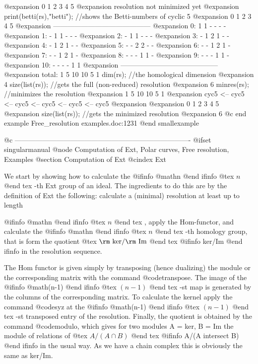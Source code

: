@expansion{} 0         1         2          3          4         5         
@expansion{} resolution not minimized yet
@expansion{} 
  print(betti(rs),"betti");  //shows the Betti-numbers of cyclic 5
@expansion{}            0     1     2     3     4     5
@expansion{} ------------------------------------------
@expansion{}     0:     1     1     -     -     -     -
@expansion{}     1:     -     1     1     -     -     -
@expansion{}     2:     -     1     1     -     -     -
@expansion{}     3:     -     1     2     1     -     -
@expansion{}     4:     -     1     2     1     -     -
@expansion{}     5:     -     -     2     2     -     -
@expansion{}     6:     -     -     1     2     1     -
@expansion{}     7:     -     -     1     2     1     -
@expansion{}     8:     -     -     -     1     1     -
@expansion{}     9:     -     -     -     1     1     -
@expansion{}    10:     -     -     -     -     1     1
@expansion{} ------------------------------------------
@expansion{} total:     1     5    10    10     5     1
  dim(rs);                   //the homological dimension
@expansion{} 4
  size(list(rs));            //gets the full (non-reduced) resolution
@expansion{} 6
  minres(rs);                //minimizes the resolution
@expansion{}     1         5         10         10         5         1         
@expansion{} cyc5 <--  cyc5 <--  cyc5 <--   cyc5 <--   cyc5 <--  cyc5
@expansion{} 
@expansion{} 0         1         2          3          4         5         
@expansion{} 
  size(list(rs));            //gets the minimized resolution
@expansion{} 6
@c end example Free_resolution examples.doc:1231
@end smallexample


@c ----------------------------------------------------------------------------
@ifset singularmanual
@node Computation of Ext, Polar curves, Free resolution, Examples
@section  Computation of Ext
@cindex  Ext

We start by showing how to calculate the 
@ifinfo
@math{n}
@end ifinfo
@tex
$n$
@end tex
-th Ext group of an
ideal. The ingredients to do this are by the definition of Ext the
following: calculate a (minimal) resolution at least up to length

@ifinfo
@math{n}
@end ifinfo
@tex
$n$
@end tex
, apply the Hom-functor, and calculate the 
@ifinfo
@math{n}
@end ifinfo
@tex
$n$
@end tex
-th homology
group, that is form the quotient
@tex
$\hbox{\rm ker} / \hbox{\rm Im}$
@end tex
@ifinfo
ker/Im
@end ifinfo
in the resolution sequence.

The Hom functor is given simply by transposing (hence dualizing) the
module or the corresponding matrix with the command @code{transpose}.
The image of the 
@ifinfo
@math{(n-1)}
@end ifinfo
@tex
$(n-1)$
@end tex
-st map is generated by the columns of the
corresponding matrix. To calculate the kernel apply the command
@code{syz} at the 
@ifinfo
@math{(n-1)}
@end ifinfo
@tex
$(n-1)$
@end tex
-st transposed entry of the resolution.
Finally, the quotient is obtained by the command @code{modulo}, which
gives for two modules A = ker, B = Im the module of relations of
@tex
$A/(A \cap B)$
@end tex
@ifinfo
A/(A intersect B)
@end ifinfo
in the usual way. As we have a chain complex this is obviously the same
as ker/Im.


